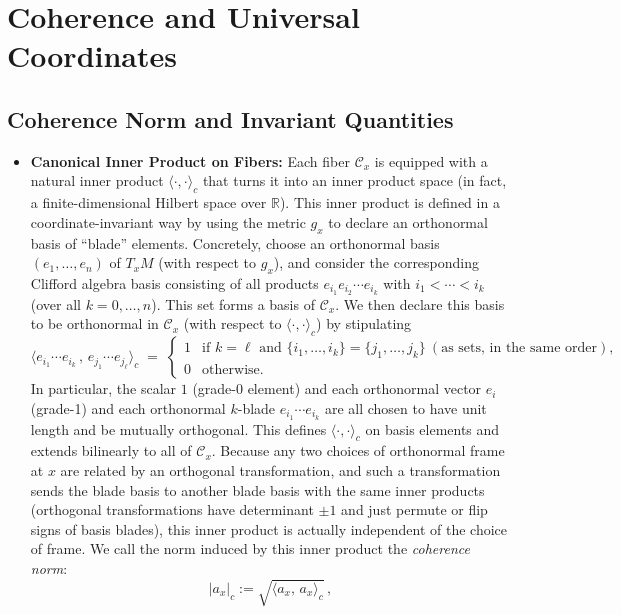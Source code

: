 \documentclass[12pt]{article}
\begin{document}
\section{Coherence and Universal Coordinates}

\subsection{Coherence Norm and Invariant Quantities}
\begin{itemize}
    \item \textbf{Canonical Inner Product on Fibers:} Each fiber $\mathcal{C}_x$ is equipped with a natural inner product $\langle\cdot,\cdot\rangle_c$ that turns it into an inner product space (in fact, a finite-dimensional Hilbert space over $\mathbb{R}$). This inner product is defined in a coordinate-invariant way by using the metric $g_x$ to declare an orthonormal basis of “blade” elements.  Concretely, choose an orthonormal basis $(e_1,\dots,e_n)$ of $T_x M$ (with respect to $g_x$), and consider the corresponding Clifford algebra basis consisting of all products $e_{i_1}e_{i_2}\cdots e_{i_k}$ with $i_1 < \cdots < i_k$ (over all $k=0,\dots,n$). This set forms a basis of $\mathcal{C}_x$. We then declare this basis to be orthonormal in $\mathcal{C}_x$ (with respect to $\langle\cdot,\cdot\rangle_c$) by stipulating 
    \[
       \Big\langle e_{i_1}\cdots e_{i_k}\,,\, e_{j_1}\cdots e_{j_\ell}\Big\rangle_c \;=\; 
       \begin{cases}
           1 & \text{if } k=\ell \text{ and } \{i_1,\dots,i_k\} = \{j_1,\dots,j_k\}\ (\text{as sets, in the same order}),\\[6pt]
           0 & \text{otherwise.}
       \end{cases}
    \] 
    In particular, the scalar $1$ (grade-0 element) and each orthonormal vector $e_i$ (grade-1) and each orthonormal $k$-blade $e_{i_1}\cdots e_{i_k}$ are all chosen to have unit length and be mutually orthogonal. This defines $\langle\cdot,\cdot\rangle_c$ on basis elements and extends bilinearly to all of $\mathcal{C}_x$. Because any two choices of orthonormal frame at $x$ are related by an orthogonal transformation, and such a transformation sends the blade basis to another blade basis with the same inner products (orthogonal transformations have determinant $\pm 1$ and just permute or flip signs of basis blades), this inner product is actually independent of the choice of frame. We call the norm induced by this inner product the \emph{coherence norm}: 
    \[
        |a_x|_c := \sqrt{\langle a_x,\,a_x\rangle_c}\,,
\]
\end{itemize}
\end{document}
